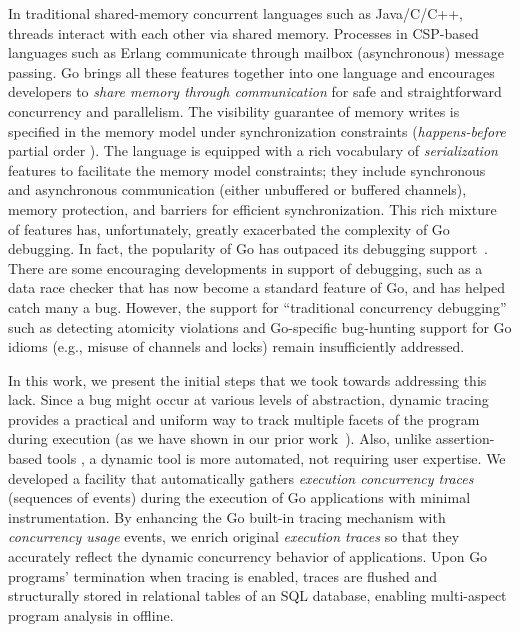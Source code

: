 In traditional shared-memory concurrent languages such as Java/C/C++, threads interact with each other via shared memory.
%
Processes in CSP-based languages such as Erlang communicate through mailbox (asynchronous) message passing.
%
Go brings all these features together into one language and encourages developers to \textit{share memory through communication} for safe and straightforward concurrency and parallelism.
%
The visibility guarantee of memory writes is specified in the memory model\cite{go-memModel} under synchronization constraints (\textit{happens-before} partial order \cite{lamport-hb-1978}).
%
The language is equipped with a rich vocabulary of \textit{serialization} features to facilitate the memory model constraints; they include synchronous and asynchronous communication (either unbuffered or buffered channels), memory protection, and barriers for efficient synchronization.
%
This rich mixture of features has, unfortunately, greatly exacerbated the complexity of Go debugging.
%
In fact, the popularity of Go has outpaced its debugging support~\cite{go-survey,tu-concurrentBugs-asplos19,dilley-empirical-saner19}.
%
There are some encouraging developments in support of debugging, such as a data race checker \cite{go-race-blog} that has now become a standard feature of Go, and has helped catch many a bug.
%
However, the support for ``traditional concurrency debugging'' such as detecting atomicity violations and Go-specific bug-hunting support for Go idioms (e.g., misuse of channels and locks) remain insufficiently addressed.
%

 In
this work, we present the initial steps that we took towards addressing this lack.
%
Since a bug might
occur
at various levels of abstraction, dynamic tracing provides a practical and uniform way to track multiple facets of the program during execution (as we have shown in our prior work~\cite{difftrace}).
%
Also, unlike assertion-based tools \cite{lange-staticType-icse18,wolf-gobra-cav21}, a dynamic tool is more automated, not requiring user expertise.
%
We developed a facility that automatically gathers \textit{execution concurrency traces} (\ie sequences of events) during the execution of Go applications with minimal instrumentation.
%
By enhancing the Go built-in tracing mechanism with \textit{concurrency usage} events, we enrich original \textit{execution traces} so that they accurately reflect the dynamic concurrency behavior of applications.
%
Upon Go programs' termination when tracing is enabled, traces are flushed and structurally stored in relational tables of an SQL database, enabling multi-aspect program analysis in offline.
%

